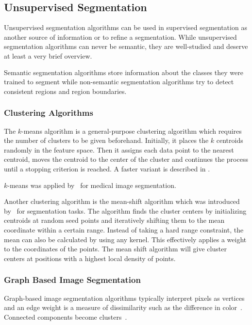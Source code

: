 
\subsection{Unsupervised Segmentation}%
\label{subsec:unsupervised-traditional-segmentation}%

Unsupervised segmentation algorithms can be used in supervised segmentation as
another source of information or to refine a segmentation. While unsupervised
segmentation algorithms can never be semantic, they are well-studied and
deserve at least a very brief overview.

Semantic segmentation algorithms store information about the classes they were
trained to segment while non-semantic segmentation algorithms try to detect
consistent regions and region boundaries.

\subsubsection{Clustering Algorithms}
The $k$-means algorithm is a general-purpose clustering algorithm which
requires the number of clusters to be given beforehand. Initially, it places
the $k$ centroids randomly in the feature space. Then it assigns each
data point to the nearest centroid, moves the centroid to the center of the
cluster and continues the process until a stopping criterion is reached. A
faster variant is described in \cite{hartigan1975clustering}.

$k$-means was applied by~\cite{chen1998image} for medical image segmentation.

Another clustering algorithm is the mean-shift algorithm which was introduced
by~\cite{comaniciu2002mean} for segmentation tasks. The algorithm finds the
cluster centers by initializing centroids at random seed points and iteratively
shifting them to the mean coordinate within a certain range. Instead of taking
a hard range constraint, the mean can also be calculated by using any kernel.
This effectively applies a weight to the coordinates of the points. The mean
shift algorithm will give cluster centers at positions with a highest local
density of points.


\subsubsection{Graph Based Image Segmentation}%
\label{subsec:graph-based-image-segmentation}%
Graph-based image segmentation algorithms typically interpret pixels as
vertices and an edge weight is a measure of dissimilarity such as the
difference in color~\cite{felzenszwalb2004efficient,FelzenszwalbGraphCode}.
Connected components become clusters~\cite{pantofaru2005comparison}.

